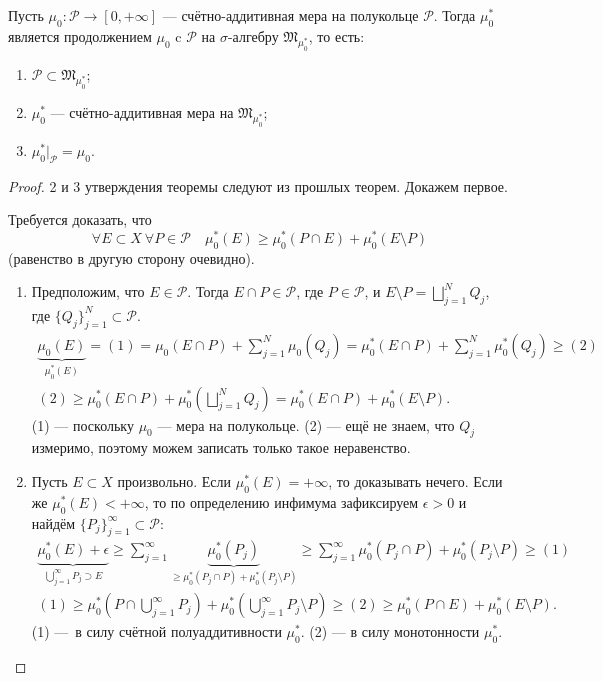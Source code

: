 \begin{theorem}
    Пусть $\mu_0: \mathcal{P} \to [0, +\infty]$ — счётно-аддитивная мера на полукольце $\mathcal{P}$.
    Тогда $\mu_0^*$ является продолжением $\mu_0$ c $\mathcal{P}$ на $\sigma$-алгебру $\mathfrak{M}_{\mu_0^*}$, то есть:
    \begin{enumerate}
        \item $\mathcal{P} \subset \mathfrak{M}_{\mu_0^*}$;
        \item $\mu_0^*$ — счётно-аддитивная мера на $\mathfrak{M}_{\mu_0^*}$;
        \item $\mu_0^*\vert_{\mathcal{P}} = \mu_0$.
    \end{enumerate}
\end{theorem} 
\begin{proof}
    2 и 3 утверждения теоремы следуют из прошлых теорем. Докажем первое.

    Требуется доказать, что 
    \[\forall E \subset X \ \forall P \in \mathcal{P} \quad \mu_0^*(E) \geqslant \mu_0^*(P \cap E) + \mu_0^*(E \setminus P)\]
    (равенство в другую сторону очевидно).

    \begin{enumerate}
        \item Предположим, что $E \in \mathcal{P}$.
        Тогда $E \cap P \in \mathcal{P}$, где $P \in \mathcal{P}$, и $E \setminus P = \bigsqcup\limits_{j=1}^{N} Q_j$, где $\{Q_j\}_{j=1}^N \subset \mathcal{P}$.
        \begin{multline*}
            \underbrace{\mu_0(E)}_{\mu_0^*(E)} = (1) = \mu_0(E \cap P) + \sum\limits_{j=1}^{N} \mu_0(Q_j) = \mu_0^*(E \cap P) + \sum\limits_{j=1}^{N} \mu_0^*(Q_j) \geqslant (2) \\
            (2) \geqslant \mu_0^*(E \cap P) + \mu_0^*\left(\bigsqcup\limits_{j=1}^{N} Q_j\right) = \mu_0^*(E \cap P) + \mu_0^*(E \setminus P).
        \end{multline*}
        (1) — поскольку $\mu_0$ — мера на полукольце.
        (2) — ещё не знаем, что $Q_j$ измеримо, поэтому можем записать только такое неравенство.

        \item Пусть $E \subset X$ произвольно.
        Если $\mu_0^*(E) = + \infty$, то доказывать нечего.
        Если же $\mu_0^*(E) < + \infty$, то по определению инфимума зафиксируем $\epsilon > 0$ и найдём $\{P_j\}_{j=1}^{\infty} \subset \mathcal{P}$:
        \begin{multline*}
            \underbrace{\mu_0^*(E) + \epsilon}_{\bigcup\limits_{j=1}^{\infty} P_j \supset E} \geqslant \sum\limits_{j=1}^{\infty} \underbrace{\mu_0^*(P_j)}_{\geqslant \mu_0^*(P_j \cap P) + \mu_0^*(P_j \setminus P)} \geqslant \sum\limits_{j=1}^{\infty} \mu_0^*(P_j \cap P) + \mu_0^*(P_j \setminus P) \geqslant (1) \\
            (1) \geqslant \mu_0^*\left(P \cap \bigcup\limits_{j=1}^{\infty} P_j\right) + \mu_0^* \left(\bigcup\limits_{j=1}^{\infty} P_j \setminus P\right) \geqslant (2) \geqslant \mu_0^*(P \cap E) + \mu_0^*(E \setminus P).
        \end{multline*}
        (1) — в силу счётной полуаддитивности $\mu_0^*$.
        (2) — в силу монотонности $\mu_0^*$.


\end{enumerate}
\end{proof}
